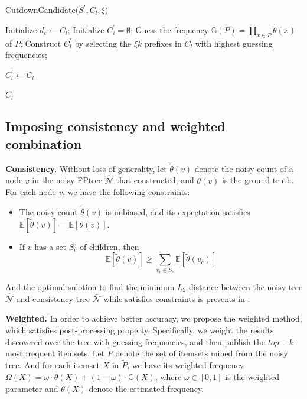 \documentclass[conference]{IEEEtran}
\begin{document}
\begin{algorithm}[]
\caption{CutdownCandidate($S^{\prime},C_l,\xi$)}
\label{alg:cutdown candidate}
\begin{algorithmic}[1]

\STATE Initialize $d_c \gets C_l$;
\STATE Initialize $C^{\prime}_{i} = \emptyset$;
    \STATE Guess the frequency $\mathbb{G}(P)=\prod_{x \in P} \tilde{\theta}(x)$ of $P$;        
  \ENDFOR
  \STATE Construct $C^{\prime}_{l}$ by selecting the $\xi k$ prefixes in $C_l$ with highest guessing frequencies;

\ELSE
  \STATE $C^{\prime}_{l} \gets C_l$

\ENDIF 

\RETURN $C^{\prime}_{l}$
\end{algorithmic}
\end{algorithm}



\subsection{Imposing consistency and weighted combination}
\label{optimize}
\textbf{Consistency.} Without loss of generality, let $\tilde{\theta}(v)$ denote the noisy count of a node $v$ in the noisy FPtree $\hat{\mathcal{N}}$ that constructed, and $\theta(v)$ is the ground truth. For each node $v$, we have the following constraints:
\begin{itemize}
\item The noisy count $\tilde{\theta}(v)$ is unbiased, and its expectation satisfies $\mathbb{E}[\tilde{\theta}(v)] = \mathbb{E}[\theta(v)]$.
\item If $v$ has a set $S_c$ of children, then\\
$$\mathbb{E}[\tilde{\theta}(v)] \geq \sum_{v_c \in S_c} \mathbb{E}[\tilde{\theta}(v_c)]$$
\end{itemize} 


{\color{red}And the optimal sulotion to find the minimum $L_2$ distance between the noisy tree $\hat{\mathcal{N}}$ and consistency tree $\bar{\mathcal{N}}$ while satisfies constraints is presents in \cite{a5}.}

\textbf{Weighted.} In order to achieve better accuracy, we propose the weighted method, which satisfies post-processing property. Specifically, we weight the results discovered over the tree with guessing frequencies, and then publish the $top-k$ most frequent itemsets. Let $\tilde{P}$ denote the set of itemsets mined from the noisy tree. And for each itemset $X$ in $\tilde{P}$, we have its weighted frequency $\Omega (X) = \omega \cdot \tilde{\theta}(X) + (1-\omega)\cdot \mathbb{G}(X)$, where $\omega \in [0,1]$ is the weighted parameter and $ \tilde{\theta}(X)$ denote the estimated frequency.
\end{document}
